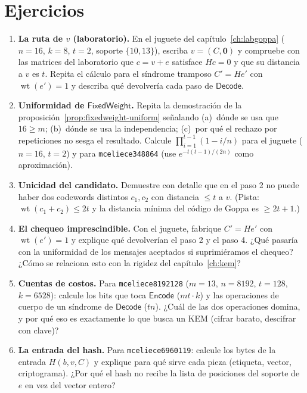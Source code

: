 \documentclass[11pt,a4paper,oneside]{report}
\newcommand{\wt}{\operatorname{wt}}
\begin{document}
\section{Ejercicios}

\begin{enumerate}[leftmargin=1.6em,itemsep=4pt]
  \item \textbf{La ruta de $v$ (laboratorio).} En el juguete del
        capítulo~\ref{ch:labgoppa} ($n=16$, $k=8$, $t=2$, soporte
        $\{10,13\}$), escriba $v=(C,\mathbf{0})$ y compruebe con las
        matrices del laboratorio que $c=v+e$ satisface $Hc=0$ y que su
        distancia a $v$ es $t$. Repita el cálculo para el síndrome
        tramposo $C'=He'$ con $\wt(e')=1$ y describa qué devolvería
        cada paso de $\textsf{Decode}$.
  \item \textbf{Uniformidad de $\textsf{FixedWeight}$.} Repita la
        demostración de la proposición~\ref{prop:fixedweight-uniform}
        señalando (a)~dónde se usa que $16\ge m$;
        (b)~dónde se usa la independencia; (c)~por qué el rechazo por
        repeticiones no sesga el resultado. Calcule
        $\prod_{i=1}^{t-1}(1-i/n)$ para el juguete ($n=16$, $t=2$) y
        para \texttt{mceliece348864} (use $e^{-t(t-1)/(2n)}$ como
        aproximación).
  \item \textbf{Unicidad del candidato.} Demuestre con detalle que en
        el paso 2 no puede haber dos codewords distintos $c_1,c_2$
        con distancia $\le t$ a $v$. (Pista:
        $\wt(c_1+c_2)\le2t$ y la distancia mínima del código de Goppa
        es $\ge2t+1$.)
  \item \textbf{El chequeo imprescindible.} Con el juguete, fabrique
        $C'=He'$ con $\wt(e')=1$ y explique qué devolverían el paso 2
        y el paso 4. ¿Qué pasaría con la uniformidad de los mensajes
        aceptados si suprimiéramos el chequeo? ¿Cómo se relaciona esto
        con la rigidez del capítulo~\ref{ch:kem}?
  \item \textbf{Cuentas de costos.} Para \texttt{mceliece8192128}
        ($m=13$, $n=8192$, $t=128$, $k=6528$): calcule los bits que
        toca $\textsf{Encode}$ ($mt\cdot k$) y las operaciones de
        cuerpo de un síndrome de $\textsf{Decode}$ ($tn$). ¿Cuál de
        las dos operaciones domina, y por qué eso es exactamente lo
        que busca un KEM (cifrar barato, descifrar con clave)?
  \item \textbf{La entrada del hash.} Para \texttt{mceliece6960119}:
        calcule los bytes de la entrada $H(b,v,C)$ y explique para qué
        sirve cada pieza (etiqueta, vector, criptograma). ¿Por qué el
        hash no recibe la lista de posiciones del soporte de $e$ en
        vez del vector entero?
\end{enumerate}
\end{document}
